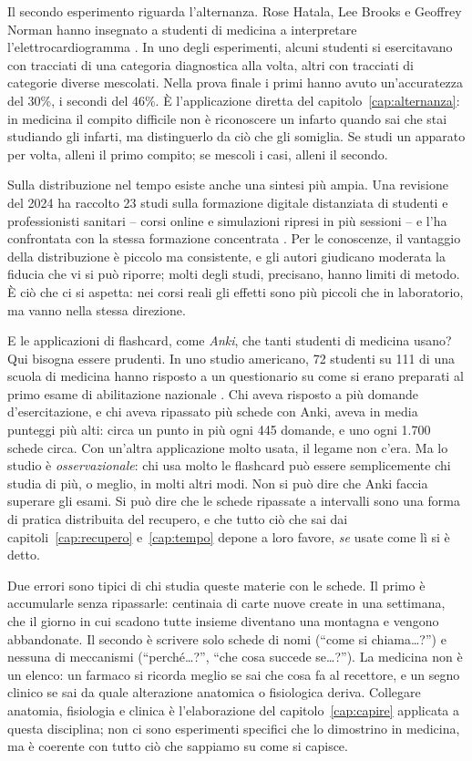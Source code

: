 Il secondo esperimento riguarda l'alternanza. Rose Hatala, Lee Brooks e
Geoffrey Norman hanno insegnato a studenti di medicina a interpretare
l'elettrocardiogramma \parencite{hatala2003}. In uno degli esperimenti,
alcuni studenti si esercitavano con tracciati di una categoria
diagnostica alla volta, altri con tracciati di categorie diverse
mescolati. Nella prova finale i primi hanno avuto un'accuratezza del
30\%, i secondi del 46\%. È l'applicazione diretta del
capitolo~\ref{cap:alternanza}: in medicina il compito difficile non è
riconoscere un infarto quando sai che stai studiando gli infarti, ma
distinguerlo da ciò che gli somiglia. Se studi un apparato per volta,
alleni il primo compito; se mescoli i casi, alleni il secondo.

Sulla distribuzione nel tempo esiste anche una sintesi più ampia. Una
revisione del 2024 ha raccolto 23 studi sulla formazione digitale
distanziata di studenti e professionisti sanitari -- corsi online e
simulazioni ripresi in più sessioni -- e l'ha confrontata con la stessa
formazione concentrata \parencite{martinengo2024}. Per le conoscenze,
il vantaggio della distribuzione è piccolo ma consistente, e gli autori
giudicano moderata la fiducia che vi si può riporre; molti degli studi,
precisano, hanno limiti di metodo. È ciò che ci si aspetta: nei corsi
reali gli effetti sono più piccoli che in laboratorio, ma vanno nella
stessa direzione.

E le applicazioni di flashcard, come \emph{Anki}, che tanti studenti
di medicina usano? Qui bisogna essere prudenti. In uno studio
americano, 72 studenti su 111 di una scuola di medicina hanno risposto
a un questionario su come si erano preparati al primo esame di
abilitazione nazionale \parencite{deng2015}. Chi aveva risposto a più
domande d'esercitazione, e chi aveva ripassato più schede con Anki,
aveva in media punteggi più alti: circa un punto in più ogni 445
domande, e uno ogni 1.700 schede circa. Con un'altra applicazione molto
usata, il legame non c'era. Ma lo studio è \emph{osservazionale}: chi
usa molto le flashcard può essere semplicemente chi studia di più, o
meglio, in molti altri modi. Non si può dire che Anki faccia superare
gli esami. Si può dire che le schede ripassate a intervalli sono una
forma di pratica distribuita del recupero, e che tutto ciò che sai dai
capitoli~\ref{cap:recupero} e~\ref{cap:tempo} depone a loro favore,
\emph{se} usate come lì si è detto.

Due errori sono tipici di chi studia queste materie con le schede. Il
primo è accumularle senza ripassarle: centinaia di carte nuove create in
una settimana, che il giorno in cui scadono tutte insieme diventano una
montagna e vengono abbandonate. Il secondo è scrivere solo schede di
nomi (\enquote{come si chiama\dots?}) e nessuna di meccanismi
(\enquote{perché\dots?}, \enquote{che cosa succede se\dots?}). La
medicina non è un elenco: un farmaco si ricorda meglio se sai che cosa
fa al recettore, e un segno clinico se sai da quale alterazione
anatomica o fisiologica deriva. Collegare anatomia, fisiologia e clinica
è l'elaborazione del capitolo~\ref{cap:capire} applicata a questa
disciplina; non ci sono esperimenti specifici che lo dimostrino in
medicina, ma è coerente con tutto ciò che sappiamo su come si capisce.

